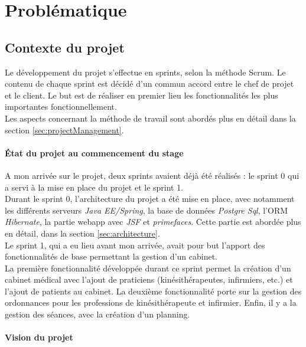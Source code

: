 \newpage
\section{Problématique}\label{sec:pb} %

\subsection{Contexte du projet}
Le développement du projet s'effectue en sprints, selon la méthode Scrum. Le contenu de chaque sprint est décidé d'un commun accord entre le chef de projet et le client. Le but est de réaliser en premier lieu les fonctionnalités les plus importantes fonctionnellement.\\
Les aspects concernant la méthode de travail sont abordés plus en détail dans la section \ref{sec:projectManagement}.

\paragraph*{État du projet au commencement du stage\\}
A mon arrivée sur le projet, deux sprints avaient déjà été réalisés : le sprint 0 qui a servi à la mise en place du projet et le sprint 1.\\

Durant le sprint 0, l'architecture du projet a été mise en place, avec notamment les différents serveurs \textit{Java EE/Spring}, la base de données \textit{Postgre Sql}, l'\gls{ORM} \textit{Hibernate}, la partie webapp avec \textit{JSF} et \textit{primefaces}.
Cette partie est abordée plus en détail, dans la section \ref{sec:architecture}.\\

Le sprint 1, qui a eu lieu avant mon arrivée, avait pour but l'apport des fonctionnalités de base permettant la gestion d'un cabinet.\\
La première fonctionnalité développée durant ce sprint permet la création d'un cabinet médical avec l'ajout de praticiens (kinésithérapeutes, infirmiers, etc.) et l'ajout de patients au cabinet.
La deuxième fonctionnalité porte sur la gestion des ordonnances pour les professions de kinésithérapeute et infirmier. Enfin, il y a la gestion des séances, avec la création d'un planning.

\paragraph*{Vision du projet\\}

